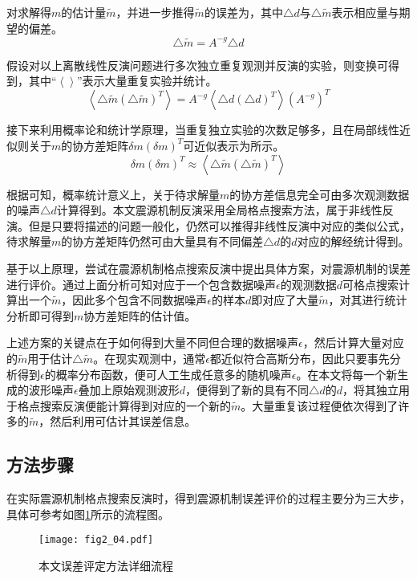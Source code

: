 对求解得$m$的估计量$\tilde{m}$，并进一步推得$\tilde{m}$的误差为，其中${\triangle}d$与${\triangle}\tilde{m}$表示相应量与期望的偏差。
\begin{equation}
\label{eq2_18}
	\triangle{\tilde{m}}=A^{-g}{\triangle}d
\end{equation}

假设对以上离散线性反演问题进行多次独立重复观测并反演的实验，则变换可得到，其中“$\left \langle \right \rangle$”表示大量重复实验并统计。
\begin{equation}
\label{eq2_19}
	\left \langle \triangle{\tilde{m}}(\triangle{\tilde{m}})^T \right \rangle=
	A^{-g}\left \langle {\triangle}d({\triangle}d)^T \right \rangle  (A^{-g})^T
\end{equation}

接下来利用概率论和统计学原理，当重复独立实验的次数足够多，且在局部线性近似则关于$m$的协方差矩阵${\delta}m({\delta}m)^T$可近似表示为所示。
\begin{equation}
\label{eq2_20}
	{\delta}m({\delta}m)^T \approx \left \langle \triangle{\tilde{m}}(\triangle{\tilde{m}})^T \right \rangle
\end{equation}

根据可知，概率统计意义上，关于待求解量$m$的协方差信息完全可由多次观测数据的噪声${\triangle}d$计算得到。本文震源机制反演采用全局格点搜索方法，属于非线性反演。但是只要将描述的问题一般化，仍然可以推得非线性反演中对应的类似公式，待求解量$m$的协方差矩阵仍然可由大量具有不同偏差${\triangle}d$的$d$对应的解经统计得到。

基于以上原理，尝试在震源机制格点搜索反演中提出具体方案，对震源机制的误差进行评价。通过上面分析可知对应于一个包含数据噪声$\epsilon$的观测数据$d$可格点搜索计算出一个$\tilde{m}$，因此多个包含不同数据噪声$\epsilon$的样本$d$即对应了大量$\tilde{m}$，对其进行统计分析即可得到$m$协方差矩阵的估计值。

上述方案的关键点在于如何得到大量不同但合理的数据噪声$\epsilon$，然后计算大量对应的$\tilde{m}$用于估计${\triangle}\tilde{m}$。在现实观测中，通常$\epsilon$都近似符合高斯分布，因此只要事先分析得到$\epsilon$的概率分布函数，便可人工生成任意多的随机噪声$\epsilon$。在本文将每一个新生成的波形噪声$\epsilon$叠加上原始观测波形$d$，便得到了新的具有不同${\triangle}d$的$d$，将其独立用于格点搜索反演便能计算得到对应的一个新的$\tilde{m}$。大量重复该过程便依次得到了许多的$\tilde{m}$，然后利用可估计其误差信息。

\subsection{方法步骤}
在实际震源机制格点搜索反演时，得到震源机制误差评价的过程主要分为三大步，具体可参考如图\ref{fig2_04}所示的流程图。
\begin{figure}
\centering
  \texttt{[image: fig2\_04.pdf]} 
  \caption{本文误差评定方法详细流程}
  \label{fig2_04}
\end{figure}

